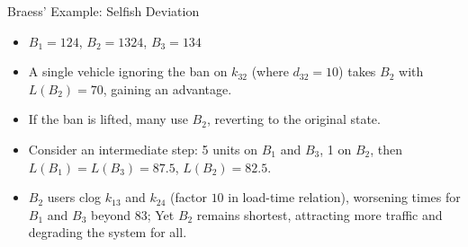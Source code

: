 \documentclass[10pt]{beamer}
\begin{document}
\begin{frame}{Braess' Example: Selfish Deviation}

  \begin{center}
  \end{center}
  \onslide<+->
  \begin{itemize}[<+->]
    \item $B_1 = 124$, $B_2 = 1324$, $B_3 = 134$
    \item A single vehicle ignoring the ban on $k_{32}$ (where $d_{32} = 10$) takes $B_2$ with $L(B_2) = 70$, gaining an advantage.
    \item If the ban is lifted, many use $B_2$, reverting to the original state. 
    \item Consider an intermediate step: 5 units on $B_1$ and $B_3$, 1 on $B_2$, then $L(B_1) = L(B_3) = 87.5$, $L(B_2) = 82.5$.
    \item $B_2$ users clog $k_{13}$ and $k_{24}$ (factor $10$ in load-time relation), worsening times for $B_1$ and $B_3$ beyond $83$; Yet $B_2$ remains shortest, attracting more traffic and degrading the system for all.
  \end{itemize}
\end{frame}
\end{document}

